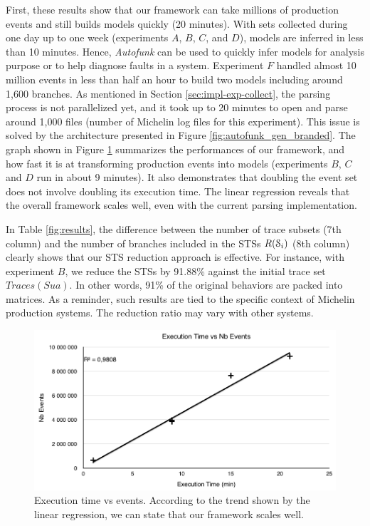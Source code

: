 First, these results show that our framework can take millions of
production events and still builds models quickly (20 minutes).
With sets collected during one day up to one week (experiments
$A$, $B$, $C$, and $D$), models are inferred in less than 10
minutes. Hence, \textit{Autofunk} can be used to quickly infer
models for analysis purpose or to help diagnose faults in a
system. Experiment $F$ handled almost 10 million events in less
than half an hour to build two models including around 1,600
branches. As mentioned in Section \ref{sec:impl-exp-collect}, the
parsing process is not parallelized yet, and it took up to 20
minutes to open and parse around 1,000 files (number of Michelin
log files for this experiment). This issue is solved by the
architecture presented in Figure \ref{fig:autofunk_gen_branded}.
The graph shown in Figure \ref{fig:time-vs-messages} summarizes
the performances of our framework, and how fast it is at
transforming production events into models (experiments $B$, $C$
and $D$ run in about 9 minutes). It also demonstrates that
doubling the event set does not involve doubling its execution
time. The linear regression reveals that the overall framework
scales well, even with the current parsing implementation.

In Table \ref{fig:results}, the difference between the number of
trace subsets (7th column) and the number of branches included in
the STSs $R(\EuScript{S}_i)$ (8th column) clearly shows that our
STS reduction approach is effective. For instance, with
experiment $B$, we reduce the STSs by 91.88\% against the initial
trace set $Traces(Sua)$. In other words, 91\% of the original
behaviors are packed into matrices. As a reminder, such results
are tied to the specific context of Michelin production systems.
The reduction ratio may vary with other systems.

\begin{figure}[ht]
  \includegraphics[width=1.0\linewidth]{figures/time-vs-messages.png}

  \caption{Execution time vs events. According to the trend shown
  by the linear regression, we can state that our framework
  scales well.}
  \label{fig:time-vs-messages}
\end{figure}

